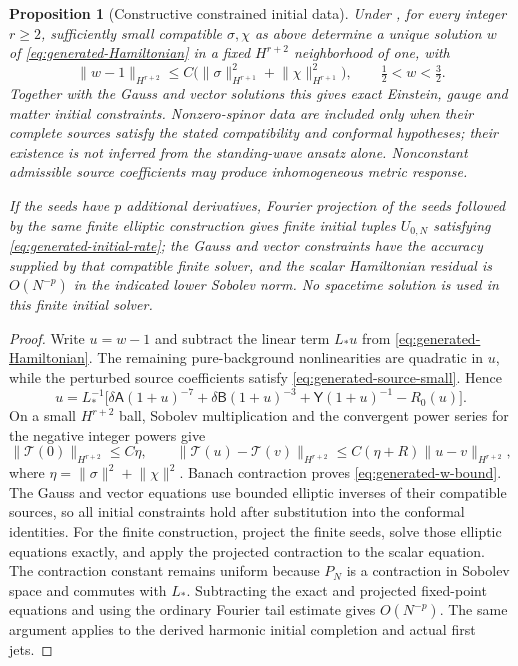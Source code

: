 \documentclass[11pt]{article}
\numberwithin{equation}{section}
\newtheorem{proposition}[proposition]{Proposition}
\theoremstyle{definition}
\theoremstyle{remark}
\newcommand{\norm}[1]{\lVert#1\rVert}
\begin{document}
\begin{proposition}[Constructive constrained initial data]
\label{prop:generated-initial}
Under , for every integer $r\ge2$, sufficiently small compatible $\sigma,\chi$ as above determine a unique solution $w$ of \eqref{eq:generated-Hamiltonian} in a fixed $H^{r+2}$ neighborhood of one, with
\begin{equation}
 \norm{w-1}_{H^{r+2}}
 \le C\bigl(\norm\sigma_{H^{r+1}}^2+\norm\chi_{H^{r+1}}^2\bigr),
 \qquad \tfrac12<w<\tfrac32.
 \label{eq:generated-w-bound}
\end{equation}
Together with the Gauss and vector solutions this gives exact Einstein, gauge and matter initial constraints.  Nonzero-spinor data are included only when their complete sources satisfy the stated compatibility and conformal hypotheses; their existence is not inferred from the standing-wave ansatz alone.  Nonconstant admissible source coefficients may produce inhomogeneous metric response.

If the seeds have $p$ additional derivatives, Fourier projection of the seeds followed by the same finite elliptic construction gives finite initial tuples $U_{0,N}$ satisfying \eqref{eq:generated-initial-rate}; the Gauss and vector constraints have the accuracy supplied by that compatible finite solver, and the scalar Hamiltonian residual is $O(N^{-p})$ in the indicated lower Sobolev norm.  No spacetime solution is used in this finite initial solver.
\end{proposition}
\begin{proof}
Write $u=w-1$ and subtract the linear term $L_*u$ from \eqref{eq:generated-Hamiltonian}.  The remaining pure-background nonlinearities are quadratic in $u$, while the perturbed source coefficients satisfy \eqref{eq:generated-source-small}.  Hence
\[
 u=L_*^{-1}\bigl[\delta\mathsf A(1+u)^{-7}
 +\delta\mathsf B(1+u)^{-3}+\mathsf Y(1+u)^{-1}-R_0(u)\bigr].
\]
On a small $H^{r+2}$ ball, Sobolev multiplication and the convergent power series for the negative integer powers give
\[
 \norm{\mathcal T(0)}_{H^{r+2}}\le C\eta,
 \qquad
 \norm{\mathcal T(u)-\mathcal T(v)}_{H^{r+2}}
 \le C(\eta+R)\norm{u-v}_{H^{r+2}},
\]
where $\eta=\norm\sigma^2+\norm\chi^2$.  Banach contraction proves \eqref{eq:generated-w-bound}.  The Gauss and vector equations use bounded elliptic inverses of their compatible sources, so all initial constraints hold after substitution into the conformal identities.  For the finite construction, project the finite seeds, solve those elliptic equations exactly, and apply the projected contraction to the scalar equation.  The contraction constant remains uniform because $P_N$ is a contraction in Sobolev space and commutes with $L_*$.  Subtracting the exact and projected fixed-point equations and using the ordinary Fourier tail estimate gives $O(N^{-p})$.  The same argument applies to the derived harmonic initial completion and actual first jets.
\end{proof}
\end{document}
